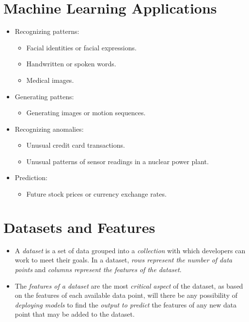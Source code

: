 \documentclass[
	title={ML Fundamentals}
]{cs584notes}
\begin{document}
\section{Machine Learning Applications}\label{sec:machine-learning-applications}
\begin{itemize}
	\item Recognizing patterns:
	\begin{itemize}
		\item Facial identities or facial expressions.
		\item Handwritten or spoken words.
		\item Medical images.
	\end{itemize}
	\item Generating pattens:
	\begin{itemize}
		\item Generating images or motion sequences.
	\end{itemize}
	\item Recognizing anomalies:
	\begin{itemize}
		\item Unusual credit card transactions.
		\item Unusual patterns of sensor readings in a nuclear power plant.
	\end{itemize}
	\item Prediction:
	\begin{itemize}
		\item Future stock prices or currency exchange rates.
	\end{itemize}
\end{itemize}

\section{Datasets and Features}\label{sec:datasets-and-features}
\begin{itemize}
	\item A \emph{dataset} is a set of data grouped into a \emph{collection} with which developers can work to meet their goals.
	In a dataset, \emph{rows represent the number of data points} and \emph{columns represent the features of the dataset}.
	\item The \emph{features of a dataset} are the most \emph{critical aspect} of the dataset, as based on the features of each available data point, will there be any possibility of \emph{deploying models} to find the \emph{output to predict} the features of any new data point that may be added to the dataset.
\end{itemize}
\end{document}
